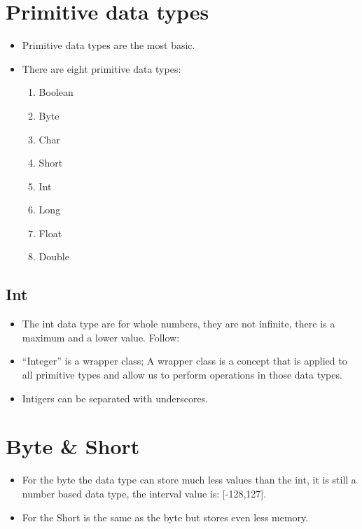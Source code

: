 \section{Primitive data types}
\begin{itemize}
    \item Primitive data types are the most basic.
    \item There are eight primitive data types:
        \begin{enumerate}
            \item Boolean 
            \item Byte 
            \item Char 
            \item Short 
            \item Int 
            \item Long 
            \item Float 
            \item Double 
        \end{enumerate}
\end{itemize}

\subsection{Int}
\begin{itemize}
    \item The int data type are for whole numbers, they are not infinite, there is a maximum and a lower value. Follow:
    
    \item ``Integer'' is a wrapper class; A wrapper class is a concept that is applied to all primitive types and allow us to perform operations in those data types.
    \item Intigers can be separated with underscores.
\end{itemize}




\section{Byte \& Short}
\begin{itemize}
    \item For the byte the data type can store much less values than the int, it is still a number based data type, the interval value is:  [-128,127].
    \item For the Short is the same as the byte but stores even less memory.
\end{itemize} 
